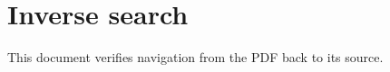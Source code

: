 \documentclass{article}
\begin{document}
\section{Inverse search}

This document verifies navigation from the PDF back to its source.
\end{document}
